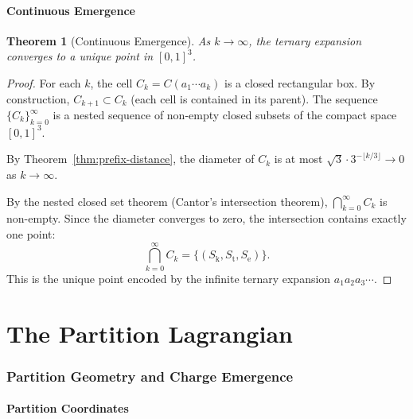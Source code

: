 \documentclass[11pt,twocolumn,a4paper]{article}
\newtheorem{theorem}{Theorem}[section]
\theoremstyle{definition}
\theoremstyle{remark}
\newcommand{\Sk}{S_{\mathrm{k}}}
\newcommand{\St}{S_{\mathrm{t}}}
\newcommand{\Se}{S_{\mathrm{e}}}
\begin{document}
\subsection{Continuous Emergence}
\label{sec:continuous-emergence}

\begin{theorem}[Continuous Emergence]
\label{thm:continuous-emergence}
As $k \to \infty$, the ternary expansion converges to a unique point in $[0,1]^3$.
\end{theorem}

\begin{proof}
For each $k$, the cell $C_k = C(a_1 \cdots a_k)$ is a closed rectangular box. By construction, $C_{k+1} \subset C_k$ (each cell is contained in its parent). The sequence $\{C_k\}_{k=0}^{\infty}$ is a nested sequence of non-empty closed subsets of the compact space $[0,1]^3$.

By Theorem~\ref{thm:prefix-distance}, the diameter of $C_k$ is at most $\sqrt{3} \cdot 3^{-\lfloor k/3 \rfloor} \to 0$ as $k \to \infty$.

By the nested closed set theorem (Cantor's intersection theorem), $\bigcap_{k=0}^{\infty} C_k$ is non-empty. Since the diameter converges to zero, the intersection contains exactly one point:
\[
  \bigcap_{k=0}^{\infty} C_k = \{(\Sk, \St, \Se)\}.
\]
This is the unique point encoded by the infinite ternary expansion $a_1 a_2 a_3 \cdots$.
\end{proof}

\part{The Partition Lagrangian}
\label{part:lagrangian}

\section{Partition Geometry and Charge Emergence}
\label{sec:partition-geometry}

\subsection{Partition Coordinates}
\label{sec:partition-coordinates}
\end{document}
